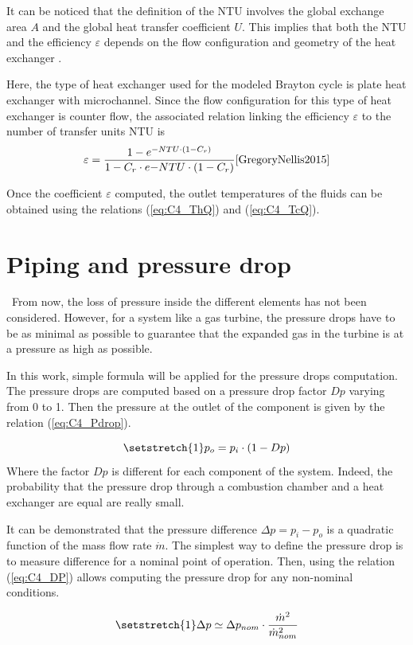 It can be noticed that the definition of the NTU involves the global exchange area $A$ and the global heat transfer coefficient $U$. This implies that both the NTU and the efficiency $\varepsilon$ depends on the flow configuration and geometry of the heat exchanger .  

Here, the type of heat exchanger used for the modeled Brayton cycle is plate heat exchanger with microchannel. Since the flow configuration for this type of heat exchanger is counter flow, the associated relation linking the efficiency \(\varepsilon\) to the number of transfer units  NTU is
\begin{equation*}
    \varepsilon = \frac{1 - e^{-NTU\cdot \left(1 - C_r\right)}}{1 - C_r\cdot e{-NTU\cdot \left(1 - C_r\right)}}\cite{GregoryNellis2015}
\end{equation*}

Once the coefficient \(\varepsilon\) computed, the outlet temperatures of the fluids can be obtained using the relations (\ref{eq:C4_ThQ}) and (\ref{eq:C4_TcQ}).


\section{Piping and pressure drop}
\quad\ From now, the loss of pressure inside the different elements has not been considered. However, for a system like a gas turbine, the pressure drops have to be as minimal as possible to guarantee that the expanded gas in the turbine is at a pressure as high as possible.

In this work, simple formula will be applied for the pressure drops computation. The pressure drops are computed based on a pressure drop factor \(Dp\) varying from 0 to 1. Then the pressure at the outlet of the component is given by the relation (\ref{eq:C4_Pdrop}).

\begin{equation}
    \setstretch{1}
    p_{o} = p_{i}\cdot (1 - Dp)\label{eq:C4_Pdrop}
\end{equation}
Where the factor \(Dp\) is different for each component of the system. Indeed, the probability that the pressure drop through a combustion chamber and a heat exchanger are equal are really small.

It can be demonstrated that the pressure difference \(\Delta p = p_{i} - p_{o}\) is a quadratic function of the mass flow rate \(\dot{m}\). The simplest way to define the pressure drop is to measure difference for a nominal point of operation. Then, using the relation (\ref{eq:C4_DP}) allows computing the pressure drop for any non-nominal conditions.

\begin{equation}
    \setstretch{1}
    \Delta p \simeq \Delta p_{nom}\cdot \frac{\dot{m}^2}{\dot{m}^2_{nom}}\label{eq:C4_DP}
\end{equation}